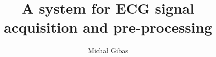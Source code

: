\documentclass[inzynier,druk,en]{dyplom}
\author{Michał Gibas}
\title{A system for ECG signal acquisition and pre-processing}
\begin{document}
\maketitle



\tableofcontents










\listoffigures
\listoflistings
\listoftables

\appendixpage
\appendix

\end{document}
